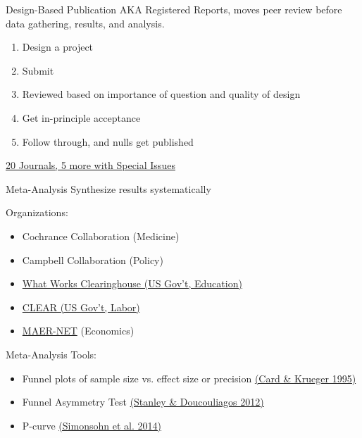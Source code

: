 \documentclass{beamer}
\begin{document}
\begin{frame}{Design-Based Publication}
AKA Registered Reports, moves peer review before data gathering, results, and analysis.

\begin{enumerate}[<.->]
\item Design a project
\item Submit
\item Reviewed based on importance of question and quality of design
\item Get in-principle acceptance
\item Follow through, and nulls get published
\end{enumerate}
\href{https://osf.io/8mpji/wiki/home/}{20 Journals, 5 more with Special Issues }
\end{frame}

\begin{frame}{Meta-Analysis}
Synthesize results systematically

\vspace{.2in}
Organizations:
\begin{itemize}[<.->]
\item Cochrance Collaboration (Medicine)
\item Campbell Collaboration (Policy)
\item \href{http://ies.ed.gov/ncee/wwc/}{What Works Clearinghouse (US Gov't, Education)}
\item \href{http://clear.dol.gov/}{CLEAR (US Gov't, Labor)}
\item \href{https://www.hendrix.edu/maer-network/}{MAER-NET} (Economics)
\end{itemize}
\end{frame}

\begin{frame}{Meta-Analysis}
Tools:
\begin{itemize}[<.->]
\item Funnel plots of sample size vs. effect size or precision \href{http://www.jstor.org/stable/2117925}{(Card \& Krueger 1995)}
\item Funnel Asymmetry Test \href{https://books.google.com/books?id=jSQEdEsL7VoC}{(Stanley \& Doucouliagos 2012)}
\item P-curve \href{http://p-curve.com/}{(Simonsohn et al. 2014)} \href{http://p-curve.com/}{}
\end{itemize}
\end{frame}
\end{document}
